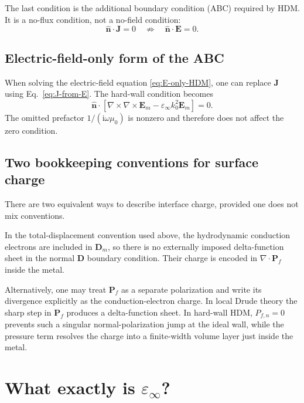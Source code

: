 \documentclass[11pt,a4paper]{article}
\newcommand{\E}{\mathbf E}
\newcommand{\Dfield}{\mathbf D}
\newcommand{\J}{\mathbf J}
\newcommand{\Pfield}{\mathbf P}
\newcommand{\nvec}{\hat{\mathbf n}}
\newcommand{\ii}{\mathrm i}
\newcommand{\epsinf}{\varepsilon_\infty}
\begin{document}
The last condition is the additional boundary condition (ABC) required by
HDM.  It is a no-flux condition, not a no-field condition:
\begin{equation}
    \nvec\!\cdot\!\J=0
    \quad\not\Rightarrow\quad
    \nvec\!\cdot\!\E=0.
    \label{eq:no-flux-not-no-field}
\end{equation}

\subsection{Electric-field-only form of the ABC}

When solving the electric-field equation \eqref{eq:E-only-HDM}, one can
replace \(\J\) using Eq.~\eqref{eq:J-from-E}.  The hard-wall condition becomes
\begin{equation}
    \boxed{
    \nvec\!\cdot
    \left[
      \nabla\!\times\!\nabla\!\times\!\E_m
      -\epsinf k_0^2\E_m
    \right]=0.
    }
    \label{eq:E-only-ABC}
\end{equation}
The omitted prefactor \(1/(\ii\omega\mu_0)\) is nonzero and therefore does
not affect the zero condition.

\subsection{Two bookkeeping conventions for surface charge}

There are two equivalent ways to describe interface charge, provided one does
not mix conventions.

In the total-displacement convention used above, the hydrodynamic conduction
electrons are included in \(\Dfield_m\), so there is no externally imposed
delta-function sheet in the normal \(\Dfield\) boundary condition.  Their
charge is encoded in \(\nabla\!\cdot\!\Pfield_f\) inside the metal.

Alternatively, one may treat \(\Pfield_f\) as a separate polarization and
write its divergence explicitly as the conduction-electron charge.  In local
Drude theory the sharp step in \(\Pfield_f\) produces a delta-function sheet.
In hard-wall HDM, \(P_{f,n}=0\) prevents such a singular normal-polarization
jump at the ideal wall, while the pressure term resolves the charge into a
finite-width volume layer just inside the metal.

\section{What exactly is \texorpdfstring{$\epsinf$}{epsilon-infinity}?}
\end{document}
